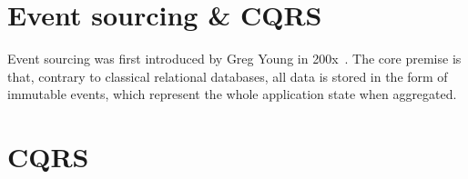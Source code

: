 \section{Event sourcing \& CQRS}
\label{sec:fundamentals:event}

Event sourcing was first introduced by Greg Young in 200x~\cite{source/link}.
The core premise is that, contrary to classical relational databases, all data is stored in the form of immutable events, which represent the whole application state when aggregated.


\cite{WEB:Fowler:2005}

\cite{WEB:Fowler:2011}

\section{CQRS}
\label{sec:fundamentals:CQRS}
